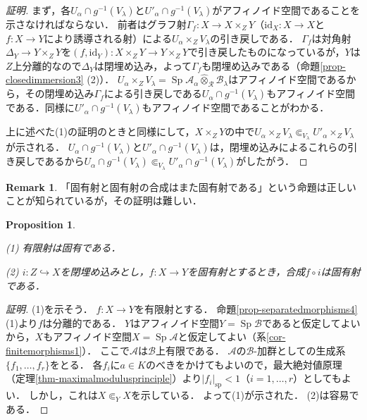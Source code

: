 \documentclass[a4paper,12pt, dvipdfmx]{jsbook}
\def\sp{\mathop{\mathrm{sp}}\nolimits}
\def\Sp{\mathop{\mathrm{Sp}}\nolimits}
\def\id{\mathrm{id}}
\newcommand{\abs}[1]{\lvert#1\rvert}
\theoremstyle{plain}
\newtheorem{prop}[thm]{\bfseries Proposition}
\theoremstyle{definition}
\newtheorem{rem}[thm]{\bfseries Remark}
\begin{document}
\begin{proof}[証明]
まず，各$U_{\alpha}\cap g^{-1}(V_{\lambda})$と$U'_{\alpha}\cap g^{-1}(V_{\lambda})$がアフィノイド空間であることを示さなければならない．
前者はグラフ射$\Gamma_f\colon X\rightarrow X\times_ZY$（$\id_X\colon X\rightarrow X$と$f\colon X\rightarrow Y$により誘導される射）による$U_{\alpha}\times_ZV_{\lambda}$の引き戻しである．
$\Gamma_f$は対角射$\Delta_Y\rightarrow Y\times_ZY$を$(f,\id_Y)\colon X\times_ZY\rightarrow Y\times_ZY$で引き戻したものになっているが，$Y$は$Z$上分離的なので$\Delta_Y$は閉埋め込み，よって$\Gamma_f$も閉埋め込みである（命題\ref{prop-closedimmersion3} (2)）．
$U_{\alpha}\times_ZV_{\lambda}=\Sp\mathcal{A}_{\alpha}\widehat{\otimes}_{\mathcal{R}}\mathcal{B}_{\lambda}$はアフィノイド空間であるから，その閉埋め込み$\Gamma_f$による引き戻しである$U_{\alpha}\cap g^{-1}(V_{\lambda})$もアフィノイド空間である．同様に$U'_{\alpha}\cap g^{-1}(V_{\lambda})$もアフィノイド空間であることがわかる．

上に述べた(1)の証明のときと同様にして，$X\times_ZY$の中で$U_{\alpha}\times_ZV_{\lambda}\Subset_{V_{\lambda}}U'_{\alpha}\times_ZV_{\lambda}$が示される．
$U_{\alpha}\cap g^{-1}(V_{\lambda})$と$U'_{\alpha}\cap g^{-1}(V_{\lambda})$は，閉埋め込みによるこれらの引き戻しであるから$U_{\alpha}\cap g^{-1}(V_{\lambda})\Subset_{V_{\lambda}}U'_{\alpha}\cap g^{-1}(V_{\lambda})$がしたがう．
\end{proof}

\begin{rem}\label{rem-propermorphisms2}{\rm 
「固有射と固有射の合成はまた固有射である」という命題は正しいことが知られているが，その証明は難しい．}
\end{rem}

\begin{prop}\label{prop-propermorphisms3}{\rm 
(1) 有限射は固有である．

(2) $i\colon Z\hookrightarrow X$を閉埋め込みとし，$f\colon X\rightarrow Y$を固有射とするとき，合成$f\circ i$は固有射である．}
\end{prop}

\begin{proof}[証明]
(1)を示そう．
$f\colon X\rightarrow Y$を有限射とする．
命題\ref{prop-separatedmorphisms4} (1)より$f$は分離的である．
$Y$はアフィノイド空間$Y=\Sp\mathcal{B}$であると仮定してよいから，$X$もアフィノイド空間$X=\Sp\mathcal{A}$と仮定してよい（系\ref{cor-finitemorphisms1}）．
ここで$\mathcal{A}$は$\mathcal{B}$上有限である．
$\mathcal{A}$の$\mathcal{B}$-加群としての生成系$\{f_1,\ldots,f_r\}$をとる．
各$f_i$に$a\in K$のべきをかけてもよいので，最大絶対値原理（定理\ref{thm-maximalmodulusprinciple}）より$\abs{f_i}_{\sp}<1$（$i=1,\ldots,r$）としてもよい．
しかし，これは$X\Subset_YX$を示している．
よって(1)が示された．
(2)は容易である．
\end{proof}
\end{document}
